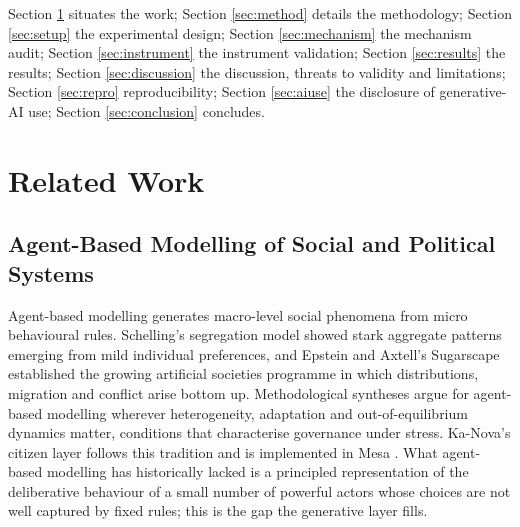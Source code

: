 \documentclass{ieeeaccess}
\begin{document}
Section \ref{sec:related} situates the work; Section \ref{sec:method}
details the methodology; Section \ref{sec:setup} the experimental
design; Section \ref{sec:mechanism} the mechanism audit; Section
\ref{sec:instrument} the instrument validation; Section
\ref{sec:results} the results; Section \ref{sec:discussion} the
discussion, threats to validity and limitations; Section
\ref{sec:repro} reproducibility; Section \ref{sec:aiuse} the
disclosure of generative-AI use; Section \ref{sec:conclusion}
concludes.

\section{Related Work}
\label{sec:related}

\subsection{Agent-Based Modelling of Social and Political Systems}
Agent-based modelling generates macro-level social phenomena from micro
behavioural rules. Schelling's segregation model \cite{schelling1971dynamic}
showed stark aggregate patterns emerging from mild individual
preferences, and Epstein and Axtell's Sugarscape
\cite{epstein1996growing} established the growing artificial societies
programme in which distributions, migration and conflict arise bottom
up. Methodological syntheses \cite{bonabeau2002agent,axelrod1997complexity,
farmer2009economy,macal2010tutorial,gilbert2005simulation,tesfatsion2006agent}
argue for agent-based modelling wherever heterogeneity, adaptation and
out-of-equilibrium dynamics matter, conditions that characterise
governance under stress. Ka-Nova's citizen layer follows this tradition
and is implemented in Mesa \cite{kazil2020mesa}. What agent-based
modelling has historically lacked is a principled representation of the
deliberative behaviour of a small number of powerful actors whose
choices are not well captured by fixed rules; this is the gap the
generative layer fills.
\end{document}
